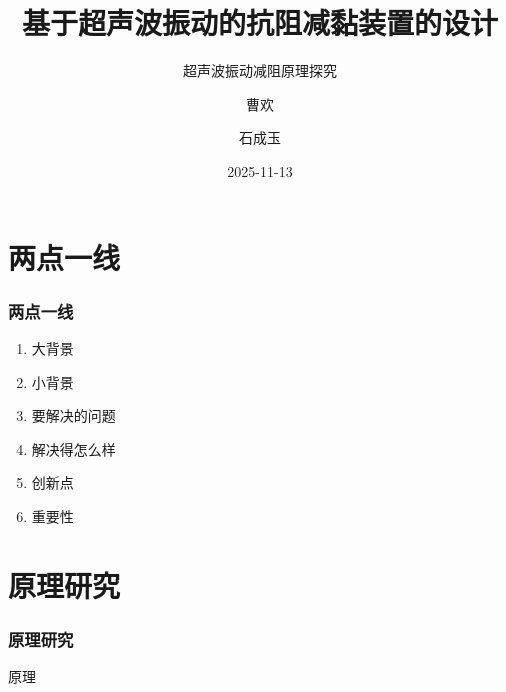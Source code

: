 \documentclass{ctexbeamer}
\title[超声波振动减阻]{基于超声波振动的抗阻减黏装置的设计}
\subtitle{超声波振动减阻原理探究}
\author{曹欢\inst{1} \and 石成玉\inst{2}}
\date{2025-11-13}
\institute[NWAFU]{\inst{1}西北农林科技大学 \and \inst{2}西北农林科技大学}
\begin{document}
	\frame{\titlepage}


	\section{两点一线}
	\begin{frame}
		\frametitle{两点一线}
		\begin{enumerate}
			\item 大背景
			\item 小背景
			\item 要解决的问题
			\item 解决得怎么样
			\item 创新点
			\item 重要性
		\end{enumerate}
	\end{frame}

	\section{原理研究}
	\begin{frame}
		\frametitle{原理研究}
		原理
	\end{frame}
\end{document}
